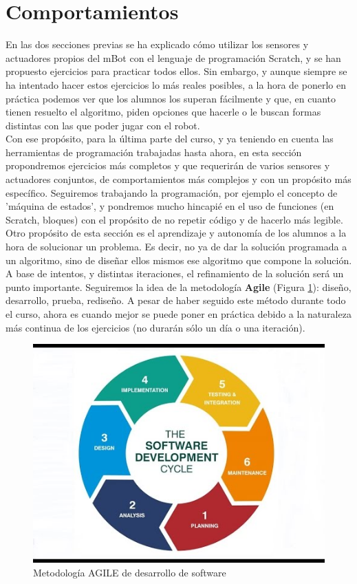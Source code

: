 \section{Comportamientos}\label{sec:comportamientos}
En las dos secciones previas se ha explicado cómo utilizar los sensores y actuadores propios del mBot con el lenguaje de programación Scratch, y se han propuesto ejercicios para practicar todos ellos. Sin embargo, y aunque siempre se ha intentado hacer estos ejercicios lo más reales posibles, a la hora de ponerlo en práctica podemos ver que los alumnos los superan fácilmente y que, en cuanto tienen resuelto el algoritmo, piden opciones que hacerle o le buscan formas distintas con las que poder jugar con el robot. \\
Con ese propósito, para la última parte del curso, y ya teniendo en cuenta las herramientas de programación trabajadas hasta ahora, en esta sección propondremos ejercicios más completos y que requerirán de varios sensores y actuadores conjuntos, de comportamientos más complejos y con un propósito más específico. Seguiremos trabajando la programación, por ejemplo el concepto de 'máquina de estados', y pondremos mucho hincapié en el uso de funciones (en Scratch, bloques) con el propósito de no repetir código y de hacerlo más legible. \\
Otro propósito de esta sección es el aprendizaje y autonomía de los alumnos a la hora de solucionar un problema. Es decir, no ya de dar la solución programada a un algoritmo, sino de diseñar ellos mismos ese algoritmo que compone la solución. A base de intentos, y distintas iteraciones, el refinamiento de la solución será un punto importante. Seguiremos la idea de la metodología \textbf{Agile} (Figura \ref{fig:agile}): diseño, desarrollo, prueba, rediseño. A pesar de haber seguido este método durante todo el curso, ahora es cuando mejor se puede poner en práctica debido a la naturaleza más continua de los ejercicios (no durarán sólo un día o una iteración).
\begin{figure}[H]\centering
	\includegraphics[scale=0.5]{img/agile.jpg}
	\caption{Metodología AGILE de desarrollo de software}
	\label{fig:agile}
\end{figure}
